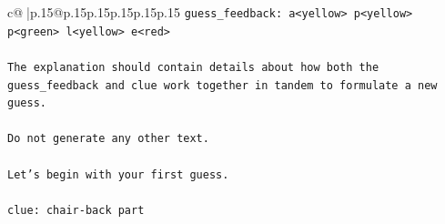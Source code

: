 \documentclass{article}
\begin{document}
{\begin{supertabular}{c@{$\;$}|p{.15\linewidth}@{}p{.15\linewidth}p{.15\linewidth}p{.15\linewidth}p{.15\linewidth}p{.15\linewidth}}
{{{\texttt{guess\_feedback: a<yellow> p<yellow> p<green> l<yellow> e<red>} \\
\\ 
\texttt{The explanation should contain details about how both the guess\_feedback and clue work together in tandem to formulate a new guess.} \\
\\ 
\texttt{Do not generate any other text.} \\
\\ 
\texttt{Let's begin with your first guess.} \\
\\ 
\texttt{clue: chair{-}back part} \\
            }
        }
    }
     \\ \\


\end{supertabular}}
\end{document}
